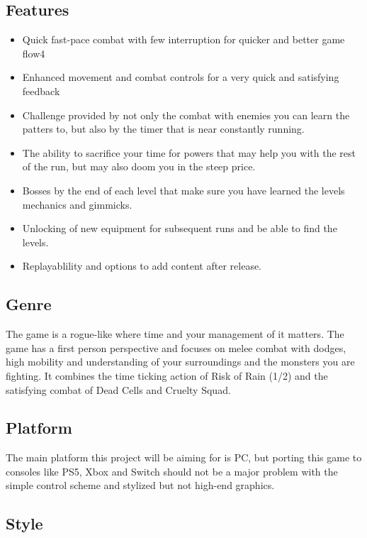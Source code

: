\documentclass[a4paper,10pt,english]{article}
\begin{document}
\subsection*{Features}

\begin{itemize}
  \item Quick fast-pace combat with few interruption for quicker and better game flow4
  \item Enhanced movement and combat controls for a very quick and satisfying feedback
  \item Challenge provided by not only the combat with enemies you can learn the patters to, but also by the timer that is near constantly running.
  \item The ability to sacrifice your time for powers that may help you with the rest of the run, but may also doom you in the steep price.
  \item Bosses by the end of each level that make sure you have learned the levels mechanics and gimmicks.
  \item Unlocking of new equipment for subsequent runs and be able to find the levels.
  \item Replayablility and options to add content after release.
\end{itemize}

\subsection*{Genre}

The game is a rogue-like where time and your management of it matters. The game has a first person perspective and focuses on melee combat with dodges, high mobility and understanding of your surroundings and the monsters you are fighting. It combines the time ticking action of Risk of Rain (1/2) and the satisfying combat of Dead Cells and Cruelty Squad. 

\subsection*{Platform}

The main platform this project will be aiming for is PC, but porting this game to consoles like PS5, Xbox and Switch should not be a major problem with the simple control scheme and stylized but not high-end graphics.

\subsection*{Style}
\end{document}

